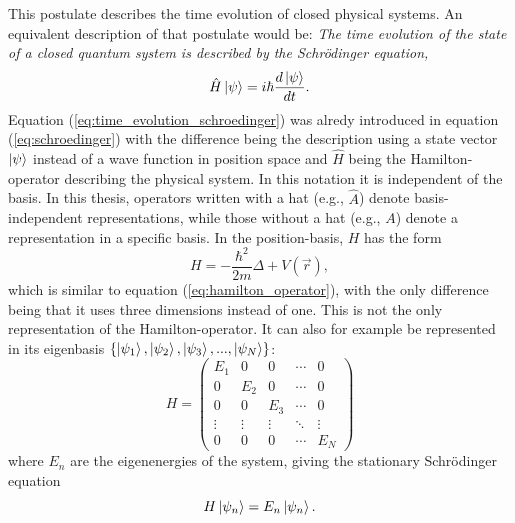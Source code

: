 	This postulate describes the time evolution of closed physical systems. An equivalent description of that postulate would be: \textit{The time evolution of the state of a closed quantum system is described by the Schrödinger equation,}
	\begin{equation}
		\label{eq:time_evolution_schroedinger}
		\hat{H}\ket{\psi}=i\hbar\frac{d\ket{\psi}}{dt}.
	\end{equation}
	Equation (\ref{eq:time_evolution_schroedinger}) was alredy introduced in equation (\ref{eq:schroedinger}) with the difference being the description using a state vector $\ket{\psi}$ instead of a wave function in position space and $\hat{H}$ being the Hamilton-operator describing the physical system. In this notation it is independent of the basis. In this thesis, operators written with a hat (e.g., $\hat{A}$) denote basis-independent representations, while those without a hat (e.g., $A$) denote a representation in a specific basis. In the position-basis, $H$ has the form
	\begin{equation}
		\label{eq:hamilton_operator_position_space}
		H=-\frac{\hbar^2}{2m}\Delta + V(\vec{r}),
	\end{equation}
	which is similar to equation (\ref{eq:hamilton_operator}), with the only difference being that it uses three dimensions instead of one. This is not the only representation of the Hamilton-operator. It can also for example be represented in its eigenbasis $\{\ket{\psi_1},\ket{\psi_2},\ket{\psi_3},...,\ket{\psi_N}\}$:
	\begin{equation}
		\label{eq:hamilton_eigenbasis}
		H=\begin{pmatrix}
			E_1 & 0 & 0 & \cdots & 0 \\
			0 & E_2 & 0 & \cdots & 0 \\
			0 & 0 & E_3 & \cdots & 0 \\
			\vdots & \vdots & \vdots & \ddots & \vdots \\
			0 & 0 & 0 & \cdots & E_N
			\end{pmatrix}
	\end{equation}
	where $E_n$ are the eigenenergies of the system, giving the stationary Schrödinger equation
	\begin{equation}
		\label{eq:stationary_schroedinger}
		H\ket{\psi_n}=E_n\ket{\psi_n}.
	\end{equation}
